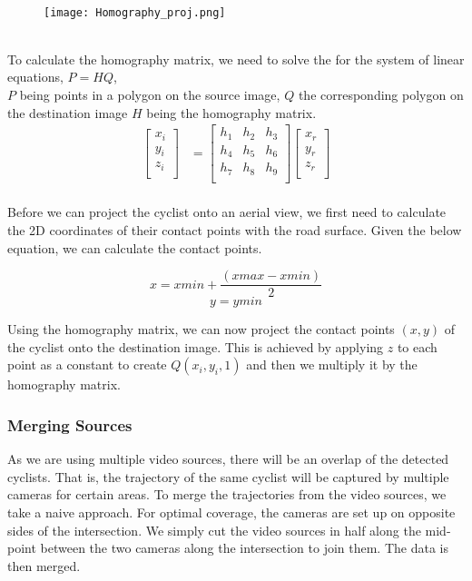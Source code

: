 \ \\ 
\begin{figure}[h]
  \texttt{[image: Homography\_proj.png]}
  \centering 
  \end{figure}
  \label{homography}
\ \\ 
To calculate the homography matrix, we need to solve the for the system of linear equations, $P = HQ$,
\ \\
$P$ being points in a polygon on the source image, $Q$ the corresponding polygon on the destination image $H$ being the homography matrix.
\begin{align}
\label{eq:3}
  \begin{bmatrix}
    x_{i} \\
    y_{i} \\
    z_{i} \\
  \end{bmatrix}
  &= \begin{bmatrix}
      h_1 & h_2 & h_3 \\
      h_4 & h_5 & h_6 \\
      h_7 & h_8 & h_9 \\
  \end{bmatrix}
  \begin{bmatrix}
    x_{r} \\
    y_{r} \\
    z_{r} \\
  \end{bmatrix}
\end{align}
\ \\

Before we can project the cyclist onto an aerial view, we first need to calculate the 2D coordinates of their contact points with the road surface.
Given the below equation, we can calculate the contact points.

$$x = xmin + \frac{(xmax - xmin)}{2}$$
$$y = ymin$$

Using the homography matrix, we can now project the contact points $(x, y)$ of the cyclist onto the destination
image. This is achieved by applying $z$ to each point as a constant to create $Q(x_i, y_i, 1)$ and then we multiply it by the homography matrix. 

\subsubsection{Merging Sources}
As we are using multiple video sources, there will be an overlap of the detected cyclists. 
That is, the trajectory of the same cyclist will be captured by multiple cameras for certain areas. 
To merge the trajectories from the video sources, we take a naive approach. For optimal coverage, the cameras are set up on
opposite sides of the intersection. We simply cut the video sources in half along the mid-point between
the two cameras along the intersection to join them. The data is then merged.

